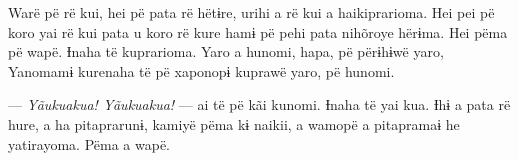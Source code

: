 
Warë pë rë kui, hei pë pata rë hëtɨre, urihi a rë kui a haikiprarioma.
Hei pei pë koro yai rë kui pata u koro rë kure hamɨ pë pehi pata
nihõroye hërɨma. Hei pëma pë wapë. Ɨnaha të kuprarioma. Yaro a hunomi,
hapa, pë përɨhɨwë yaro, Yanomamɨ kurenaha të pë xaponopɨ kuprawë yaro,
pë hunomi. 

--- \textit{Yãukuakua! Yãukuakua!} --- ai të pë kãi kunomi. Ɨnaha të yai kua. Ɨhɨ a
pata rë hure, a ha pitaprarunɨ, kamiyë pëma kɨ naikii, a wamopë a
pitapramaɨ he yatirayoma. Pëma a wapë. 

